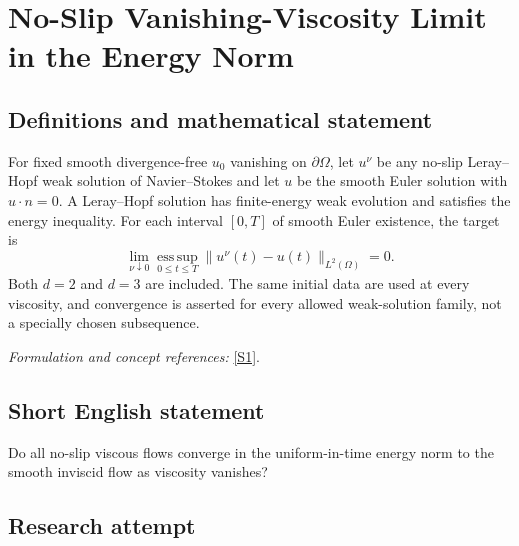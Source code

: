 \documentclass[11pt,a4paper]{article}
\newcommand{\sref}[2]{\hyperlink{source:#1:#2}{[S#2]}}
\newif\ifshowcatalogue
\newcommand{\cataloguescope}[1]{\ifshowcatalogue
 \paragraph{Exact scope in the supplied catalogue.}
 \begin{quote}\small #1\end{quote}\fi}
\numberwithin{equation}{section}
\begin{document}
\setcounter{section}{0}
\clearpage
\section*{\texorpdfstring{No-Slip Vanishing-Viscosity Limit in the Energy Norm}{No-Slip Vanishing-Viscosity Limit in the Energy Norm}}\label{30006746}
\subsection{Definitions and mathematical statement}
For fixed smooth divergence-free $u_0$ vanishing on $\partial\Omega$, let $u^\nu$ be any no-slip Leray--Hopf weak solution of Navier--Stokes and let $u$ be the smooth Euler solution with $u\cdot n=0$. A Leray--Hopf solution has finite-energy weak evolution and satisfies the energy inequality. For each interval $[0,T]$ of smooth Euler existence, the target is
\[
 \lim_{\nu\downarrow0}\operatorname*{ess\,sup}_{0\le t\le T}
 \|u^\nu(t)-u(t)\|_{L^2(\Omega)}=0.
\]
Both $d=2$ and $d=3$ are included. The same initial data are used at every viscosity, and convergence is asserted for every allowed weak-solution family, not a specially chosen subsequence.
\par\smallskip\textit{Formulation and concept references:} \sref{30006746}{1}.
\cataloguescope{For d in \{2,3\}, every smooth bounded domain Omega in R\textasciicircum{}d and every fixed smooth divergence-free initial velocity u0 vanishing on the boundary, prove or disprove that every no-slip Leray–Hopf Navier–Stokes family u\textasciicircum{}nu with viscosity nu and initial value u0 converges to the Euler solution u in L\textasciicircum{}infinity([0,T];L\textasciicircum{}2(Omega)) as nu tends to zero, for each T on which u is smooth and satisfies u.n=0.}
\subsection{Short English statement}
Do all no-slip viscous flows converge in the uniform-in-time energy norm to the smooth inviscid flow as viscosity vanishes?
\subsection{Research attempt}
\end{document}
